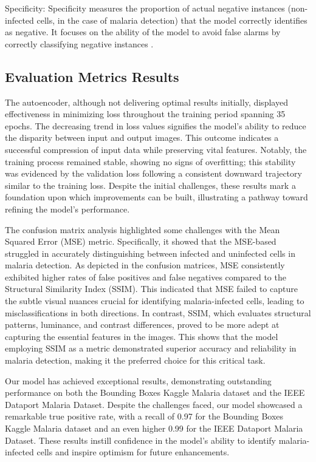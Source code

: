 \documentclass[journal,11pt,onecolumn,draftcls]{IEEEtran}
\begin{document}
Specificity: Specificity measures the proportion of actual negative instances (non-infected cells, in the case of malaria detection) that the model correctly identifies as negative. It focuses on the ability of the model to avoid false alarms by correctly classifying negative instances \cite{powers2011}.

\subsection{Evaluation Metrics Results}
The autoencoder, although not delivering optimal results initially, displayed effectiveness in minimizing loss throughout the training period spanning 35 epochs. The decreasing trend in loss values signifies the model's ability to reduce the disparity between input and output images. This outcome indicates a successful compression of input data while preserving vital features. Notably, the training process remained stable, showing no signs of overfitting; this stability was evidenced by the validation loss following a consistent downward trajectory similar to the training loss. Despite the initial challenges, these results mark a foundation upon which improvements can be built, illustrating a pathway toward refining the model's performance.

The confusion matrix analysis highlighted some challenges with the Mean Squared Error (MSE) metric. Specifically, it showed that the MSE-based struggled in accurately distinguishing between infected and uninfected cells in malaria detection. As depicted in the confusion matrices, MSE consistently exhibited higher rates of false positives and false negatives compared to the Structural Similarity Index (SSIM). This indicated that MSE failed to capture the subtle visual nuances crucial for identifying malaria-infected cells, leading to misclassifications in both directions. In contrast, SSIM, which evaluates structural patterns, luminance, and contrast differences, proved to be more adept at capturing the essential features in the images. This shows that the model employing SSIM as a metric demonstrated superior accuracy and reliability in malaria detection, making it the preferred choice for this critical task.

Our model has achieved exceptional results, demonstrating outstanding performance on both the Bounding Boxes Kaggle Malaria dataset and the IEEE Dataport Malaria Dataset. Despite the challenges faced, our model showcased a remarkable true positive rate, with a recall of 0.97 for the Bounding Boxes Kaggle Malaria dataset and an even higher 0.99 for the IEEE Dataport Malaria Dataset. These results instill confidence in the model's ability to identify malaria-infected cells and inspire optimism for future enhancements.
\end{document}
